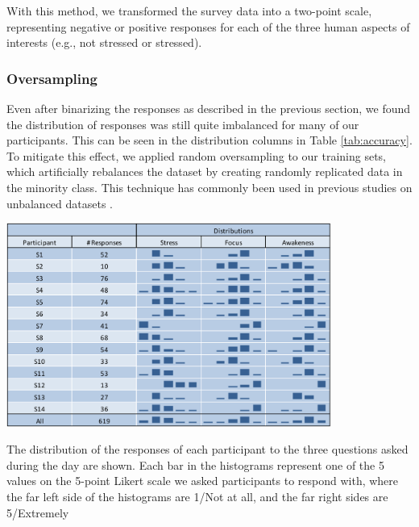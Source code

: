With this method, we transformed the survey data into a two-point scale, representing  negative or positive responses for each of the three human aspects of interests (e.g., not stressed or stressed). 

\subsubsection{Oversampling}
Even after binarizing the responses as described in the previous section, we found the distribution of responses was still quite imbalanced for many of our participants. This can be seen in the distribution columns in Table \ref{tab:accuracy}. To mitigate this effect, we applied random oversampling to our training sets, which artificially rebalances the dataset by creating randomly replicated data in the minority class. This technique has commonly been used  in previous studies on unbalanced datasets \cite{chawla2004,yap2014}.


\begin{table}
  \centering
      \includegraphics[width=0.8\textwidth]{distributiontable.pdf}
  \caption{The distribution of the responses of each participant to the three questions asked during the day are shown. Each bar in the histograms represent one of the 5 values on the 5-point Likert scale we asked participants to respond with, where the far left side of the histograms are 1/Not at all, and the far right sides are 5/Extremely}
   \label{responseDistribution}
\end{table}

